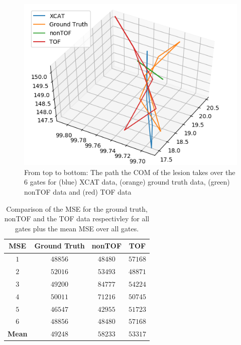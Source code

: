 \documentclass[journal]{IEEEtran}
\begin{document}
\begin{figure}[H]
    \centering
    \includegraphics[scale=0.6]{figures/graph.png}
    \caption{From top to bottom: The path the COM of the lesion takes over the $6$ gates for (blue) XCAT data, (orange) ground truth data, (green) nonTOF data and (red) TOF data}
    \label{fig:graph}
\end{figure}

\begin{table}[H]
    \centering
        \caption{Comparison of the MSE for the ground truth, nonTOF and the TOF data respectivley for all gates plus the mean MSE over all gates.}
    \begin{tabular}{||c|ccc||}
    \hline
        \textbf{MSE}    & \textbf{Ground Truth} & \textbf{nonTOF}   & \textbf{TOF}  \\
    \hline
        \textbf{$1$}    & $48856$               & $48480$           & $57168$       \\
        \textbf{$2$}    & $52016$               & $53493$           & $48871$       \\
        \textbf{$3$}    & $49200$               & $84777$           & $54224$       \\
        \textbf{$4$}    & $50011$               & $71216$           & $50745$       \\
        \textbf{$5$}    & $46547$               & $42955$           & $51723$       \\
        \textbf{$6$}    & $48856$               & $48480$           & $57168$       \\
    \hline
        \textbf{Mean}   & $49248$               & $58233$           & $53317$       \\
    \hline
    \end{tabular}
    \label{tab:mse}
\end{table}
\end{document}
